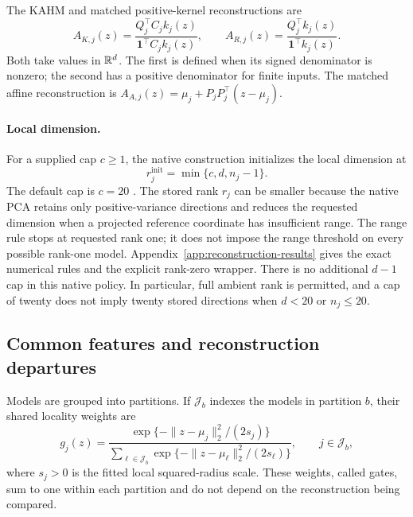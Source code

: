 The KAHM and matched positive-kernel reconstructions are
\begin{equation}
 A_{K,j}(z)=\frac{Q_j^\top C_j k_j(z)}
 {\mathbf1^\top C_j k_j(z)},\qquad
 A_{R,j}(z)=\frac{Q_j^\top k_j(z)}{\mathbf1^\top k_j(z)}.
 \label{eq:mechanism-main-maps}
\end{equation}
Both take values in $\mathbb{R}^d$. The first is defined when its signed
denominator is nonzero; the second has a positive denominator for finite
inputs. The matched affine reconstruction is
$A_{A,j}(z)=\mu_j+P_jP_j^\top(z-\mu_j)$.

\paragraph{Local dimension.}
For a supplied cap $c\geq1$, the native construction initializes the local
dimension at
\[
 r_j^{\mathrm{init}}=\min\{c,d,n_j-1\}.
\]
The default cap is $c=20$ \citep[Appendix B]{Kumar2025Collaborative}.
The stored rank $r_j$ can be smaller because the native PCA retains only
positive-variance directions and reduces the requested dimension when a
projected reference coordinate has insufficient range. The range rule
stops at requested rank one; it does not impose the range threshold on
every possible rank-one model. Appendix~\ref{app:reconstruction-results}
gives the exact numerical rules and the explicit rank-zero wrapper.
There is no additional $d-1$ cap in this native policy. In particular,
full ambient rank is permitted, and a cap of twenty does not imply twenty
stored directions when $d<20$ or $n_j\leq20$.

\subsection{Common features and reconstruction departures}

Models are grouped into partitions. If $\mathcal J_b$ indexes the models
in partition $b$, their shared locality weights are
\[
 g_j(z)=\frac{\exp\{-\|z-\mu_j\|_2^2/(2s_j)\}}
 {\sum_{\ell\in\mathcal J_b}
       \exp\{-\|z-\mu_\ell\|_2^2/(2s_\ell)\}},
 \qquad j\in\mathcal J_b,
\]
where $s_j>0$ is the fitted local squared-radius scale. These weights,
called gates, sum to one within each partition and do not depend on the
reconstruction being compared.

